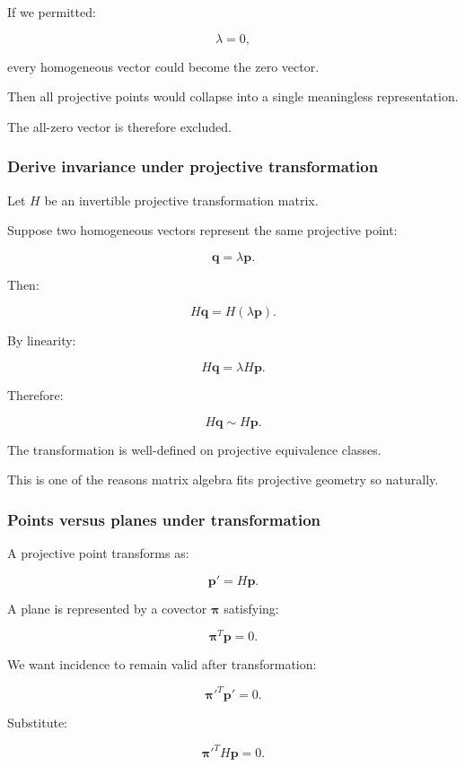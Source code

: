 If we permitted:

\[
 \lambda=0,
\]

every homogeneous vector could become the zero vector.

Then all projective points would collapse into a single meaningless representation.

The all-zero vector is therefore excluded.

\subsubsection{Derive invariance under projective transformation}\label{derive-invariance-under-projective-transformation}

Let \(H\) be an invertible projective transformation matrix.

Suppose two homogeneous vectors represent the same projective point:

\[
 \mathbf q=\lambda\mathbf p.
\]

Then:

\[
 H\mathbf q=H(\lambda\mathbf p).
\]

By linearity:

\[
 H\mathbf q=\lambda H\mathbf p.
\]

Therefore:

\[
 \boxed{ H\mathbf q\sim H\mathbf p }.
\]

The transformation is well-defined on projective equivalence classes.

This is one of the reasons matrix algebra fits projective geometry so naturally.

\subsubsection{Points versus planes under transformation}\label{points-versus-planes-under-transformation}

A projective point transforms as:

\[
 \boxed{ \mathbf p'=H\mathbf p }.
\]

A plane is represented by a covector \(\boldsymbol\pi\) satisfying:

\[
 \boldsymbol\pi^T\mathbf p=0.
\]

We want incidence to remain valid after transformation:

\[
 \boldsymbol\pi'^T\mathbf p'=0.
\]

Substitute:

\[
 \boldsymbol\pi'^TH\mathbf p=0.
\]

